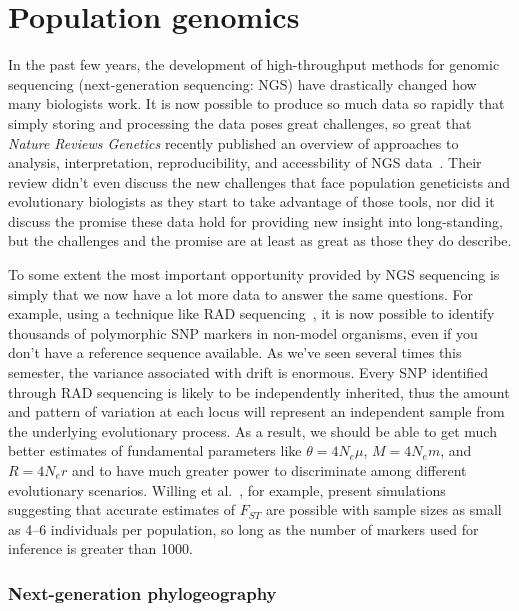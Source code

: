 \chapter{Population genomics}

In the past few years, the development of high-throughput methods for
genomic sequencing (next-generation sequencing: NGS) have drastically
changed how many biologists work. It is now possible to produce so
much data so rapidly that simply storing and processing the data poses
great challenges, so great that {\it Nature Reviews Genetics\/}
recently published an overview of approaches to analysis,
interpretation, reproducibility, and accessbility of NGS
data~\cite{Nekrutenko-Taylor-2012}. Their review didn't even discuss
the new challenges that face population geneticists and evolutionary
biologists as they start to take advantage of those tools, nor did it
discuss the promise these data hold for providing new insight into
long-standing, but the challenges and the promise are at least as
great as those they do describe.

To some extent the most important opportunity provided by NGS
sequencing is simply that we now have a lot more data to answer the
same questions. For example, using a technique like RAD
sequencing~\cite{Baird-etal-2008}, it is now possible to identify
thousands of polymorphic SNP markers in non-model organisms, even if
you don't have a reference sequence available. As we've seen several
times this semester, the variance associated with drift is
enormous. Every SNP identified through RAD sequencing is likely to be
independently inherited, thus the amount and pattern of variation at
each locus will represent an independent sample from the underlying
evolutionary process. As a result, we should be able to get much
better estimates of fundamental parameters like $\theta=4N_e\mu$,
$M=4N_em$, and $R=4N_er$ and to have much greater power to
discriminate among different evolutionary scenarios. Willing et
al.~\cite{Willing-etal-2012}, for example, present simulations
suggesting that accurate estimates of $F_{ST}$ are possible with
sample sizes as small as 4--6 individuals per population, so long as
the number of markers used for inference is greater than
1000.

\subsection*{Next-generation phylogeography}

